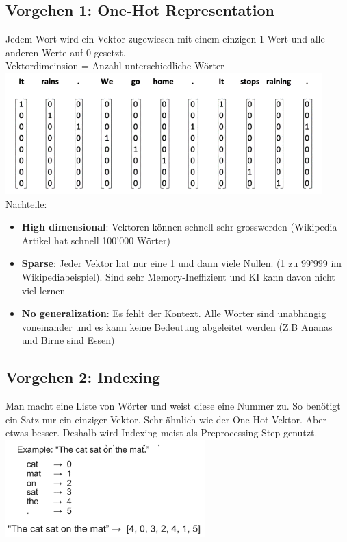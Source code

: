 \subsection{Vorgehen 1: One-Hot Representation}
Jedem Wort wird ein Vektor zugewiesen mit einem einzigen 1 Wert und alle anderen Werte auf 0 gesetzt.\\
Vektordimeinsion = Anzahl unterschiedliche Wörter
\includegraphics[width=\linewidth]{img/one-hot.png}
Nachteile:
\begin{itemize}
\item \textbf{High dimensional}: Vektoren können schnell sehr grosswerden (Wikipedia-Artikel hat schnell 100'000 Wörter)
\item \textbf{Sparse}: Jeder Vektor hat nur eine 1 und dann viele Nullen. (1 zu 99'999 im Wikipediabeispiel). Sind sehr Memory-Ineffizient und KI kann davon nicht viel lernen
\item \textbf{No generalization}: Es fehlt der Kontext. Alle Wörter sind unabhängig voneinander und es kann keine Bedeutung abgeleitet werden (Z.B Ananas und Birne sind Essen)
\end{itemize}
\subsection{Vorgehen 2: Indexing}
Man macht eine Liste von Wörter und weist diese eine Nummer zu. So benötigt ein Satz nur ein einziger Vektor. Sehr ähnlich wie der One-Hot-Vektor. Aber etwas besser. Deshalb wird Indexing meist als Preprocessing-Step genutzt.
\includegraphics[width=\linewidth]{img/indexing.png}
